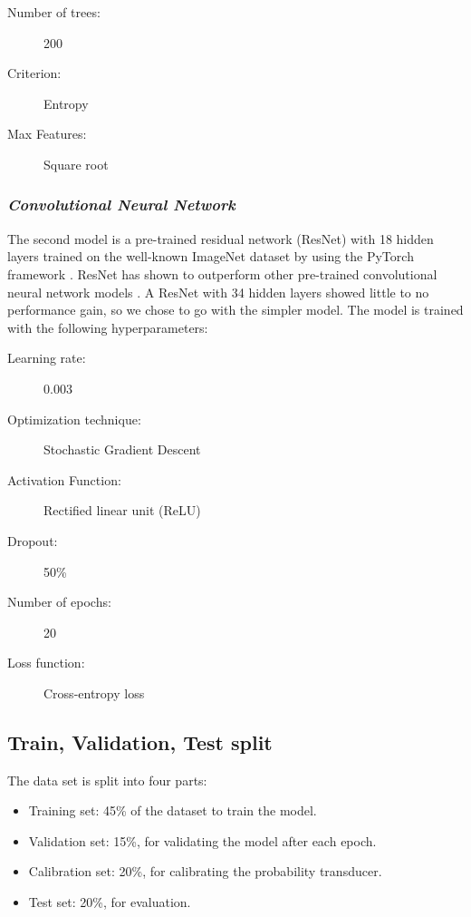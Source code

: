 \documentclass[\ifafour a4paper,12pt,\else a5paper,10pt,\fi%
onecolumn,oneside,article,%
british%
]{memoir}
\theoremstyle{remark}
\theoremstyle{innote}
\renewcommand*{\|}[1][]{\nonscript\:#1\vert\nonscript\:\mathopen{}}
\begin{document}
\medskip

\begin{framed}
  \begin{description}
  \item[Number of trees:] 200 
  \item[Criterion:] Entropy 
  \item[Max Features:] Square root
  \end{description}
\end{framed}

\subsubsection{\textit{Convolutional Neural Network}} 
The second model is a pre-trained residual network (ResNet) \autocites{heetal2016} with 18 hidden layers trained on the well-known ImageNet dataset  \autocites{russakovskyetal2015} by using the PyTorch framework \autocites{paszkeetal2019}. ResNet has shown to outperform other pre-trained convolutional neural network models \autocites{heetal2016}. A ResNet with 34 hidden layers showed little to no performance gain, so we chose to go with the simpler model. The model is trained with the following hyperparameters:
\medskip

\begin{framed}
  \begin{description}
  \item[Learning rate:] 0.003 
  \item[Optimization technique:] Stochastic Gradient Descent 
  \item[Activation Function:] Rectified linear unit (ReLU) 
  \item[Dropout:] 50\% 
  \item[Number of epochs:] 20 
  \item[Loss function:] Cross-entropy loss
  \end{description}
\end{framed}

\subsection{Train, Validation, Test split}

The data set is split into four parts:
\begin{itemize}
\item Training set: 45\% of the dataset to train the model.
\item Validation set: 15\%, for validating the model after each epoch.
\item Calibration set: 20\%, for calibrating the probability transducer.
\item Test set: 20\%, for evaluation.
\end{itemize}
\end{document}
